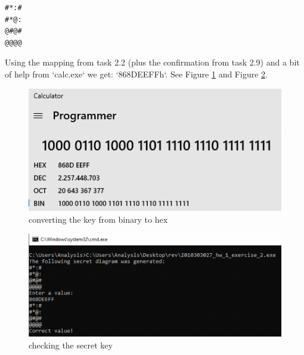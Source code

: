 \begin{lstlisting}[name={target secret pattern}]
#*:#
#*@:
@#@#
@@@@
\end{lstlisting}
\begin{markdown}

Using the mapping from task 2.2 (plus the confirmation from task 2.9) and a bit of help from `calc.exe` we get: `868DEEFFh`. See Figure \ref{pattern} and Figure \ref{solution}.

\begin{figure}[!htbp]
\centering
\includegraphics[width=\linewidth]{media/pattern.png}
\caption{converting the key from binary to hex}\label{pattern}
\end{figure}

\begin{figure}[!htbp]
\centering
\includegraphics[width=1.1\linewidth]{media/solution.png}
\caption{checking the secret key}\label{solution}
\end{figure}

\end{markdown}